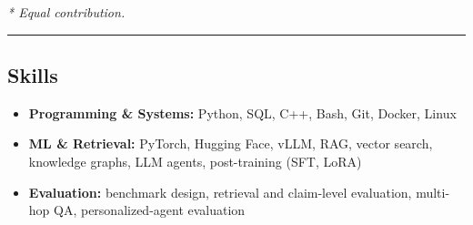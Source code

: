 \documentclass[11pt,letterpaper]{article}
\begin{document}
\noindent\textit{* Equal contribution.}

\hrule
\vspace{-1em}
\subsection*{\Large Skills}

\begin{itemize}[leftmargin=0.15in]
    \item \textbf{Programming \& Systems:} Python, SQL, C++, Bash, Git, Docker, Linux
    \item \textbf{ML \& Retrieval:} PyTorch, Hugging Face, vLLM, RAG, vector search, knowledge graphs, LLM agents, post-training (SFT, LoRA)
    \item \textbf{Evaluation:} benchmark design, retrieval and claim-level evaluation, multi-hop QA, personalized-agent evaluation
\end{itemize}
\end{document}
